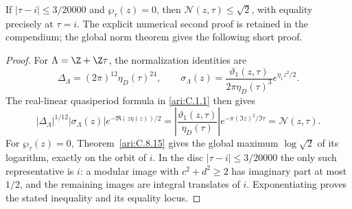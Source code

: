 \begin{theorem}\label{push:src:E.4.2}
If $|\tau-i|\leq3/20000$ and $\wp_\tau(z)=0$, then
$\mathcal N(z,\tau)\leq\sqrt2$, with equality precisely at
$\tau=i$. The explicit numerical second proof is retained in the compendium;
the global norm theorem gives the following short proof.
\end{theorem}
\begin{proof}

For $\Lambda=\Z+\Z\tau$, the normalization identities are
\[
 \Delta_\Lambda=(2\pi)^{12}\eta_D(\tau)^{24},\qquad
 \sigma_\Lambda(z)=
 \frac{\vartheta_1(z,\tau)}{2\pi\eta_D(\tau)^3}
                 e^{\eta_1z^2/2}.
\]
The real-linear quasiperiod formula in \ref{ari:C.1.1} then gives
\[
 |\Delta_\Lambda|^{1/12}|\sigma_\Lambda(z)|
 e^{-\Re(z\eta(z))/2}
 =\left|\frac{\vartheta_1(z,\tau)}{\eta_D(\tau)}\right|
            e^{-\pi(\Im z)^2/\Im\tau}
 =\mathcal N(z,\tau).
\]
For $\wp_\tau(z)=0$, Theorem~\ref{ari:C.8.15} gives the
global maximum $\log\sqrt2$ of its logarithm, exactly on the
orbit of $i$. In the disc $|\tau-i|\le3/20000$ the only such
representative is $i$: a modular image with $c^2+d^2\ge2$
has imaginary part at most $1/2$, and the remaining images
are integral translates of $i$. Exponentiating proves the
stated inequality and its equality locus.

\end{proof}
